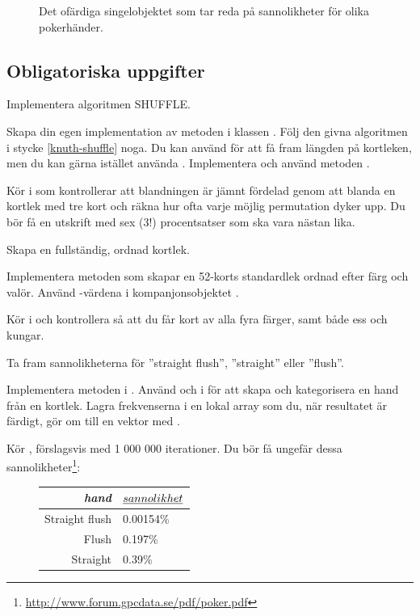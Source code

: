 \begin{figure}
\caption{Det ofärdiga singelobjektet  som tar reda på sannolikheter för olika pokerhänder.}
\label{shuffle:fig-pokerprob}
\end{figure}


\subsection{Obligatoriska uppgifter}\label{subsection:lab:shuffle:tasks}

\Task Implementera algoritmen SHUFFLE.

\Subtask Skapa din egen implementation av metoden  i klassen . Följ den givna algoritmen i stycke \ref{knuth-shuffle} noga. Du kan använd  för att få fram längden på kortleken, men du kan gärna istället använda . Implementera och använd metoden  .

\Subtask Kör  i  som kontrollerar att blandningen är jämnt fördelad genom att blanda en kortlek med tre kort och räkna hur ofta varje möjlig permutation dyker upp. Du bör få en utskrift med sex ($3!$) procentsatser som ska vara nästan lika.

\Task Skapa en fullständig, ordnad kortlek.

\Subtask Implementera metoden  som skapar en 52-korts standardlek ordnad efter färg och valör. Använd -värdena i kompanjonsobjektet . 

\Subtask Kör  i  och kontrollera så att du får kort av alla fyra färger, samt både ess och kungar.

\Task Ta fram sannolikheterna för ''straight flush'', ''straight'' eller ''flush''.

\Subtask Implementera metoden  i . Använd  och  i  för att skapa och kategorisera en hand från en kortlek. Lagra frekvenserna i en lokal array som du, när resultatet är färdigt, gör om till en vektor med .

\Subtask Kör , förslagsvis med 1 000 000 iterationer. Du bör få ungefär dessa sannolikheter\footnote{\url{http://www.forum.gpcdata.se/pdf/poker.pdf}}:
\begin{figure}[H]\centering
\begin{tabular}{r|l}
\emph{hand} & $\emph{sannolikhet}$ \\ \hline
Straight flush & 0.00154\%  \\
Flush          & 0.197\%    \\
Straight       & 0.39\%     \\
\end{tabular}
\end{figure}



